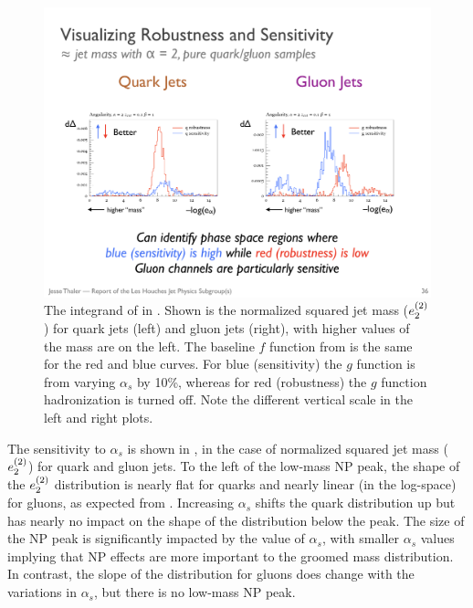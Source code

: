 \begin{figure}[t]
\begin{center}
\includegraphics[width = 0.99\columnwidth]{figures/differentialseparation.pdf}
\end{center}
\caption{The integrand of  in \herwig.  Shown is the normalized squared jet mass ($e_{2}^{(2)}$)  for quark jets (left) and gluon jets (right), with higher values of the mass are on the left.  The baseline $f$ function from  is the same for the red and blue curves.  For blue (sensitivity) the $g$ function is from varying $\alpha_s$ by 10\%, whereas for red (robustness) the $g$ function hadronization is turned off.  Note the different vertical scale in the left and right plots. }
\label{fig:differentialseparation}
\end{figure}

The sensitivity to $\alpha_s$ is shown in , in the case of normalized squared jet mass ($e_{2}^{(2)}$) for quark and gluon jets.
%
To the left of the low-mass NP peak, the shape of the $e_{2}^{(2)}$ distribution is nearly flat for quarks and nearly linear (in the log-space) for gluons, as expected from .
%
Increasing $\alpha_s$ shifts the quark distribution up but has nearly no impact on the shape of the distribution below the peak.
%
The size of the NP peak is significantly impacted by the value of $\alpha_s$, with smaller $\alpha_s$ values implying that NP effects are more important to the groomed mass distribution.
%
In contrast, the slope of the distribution for gluons does change with the variations in $\alpha_s$, but there is no low-mass NP peak.

